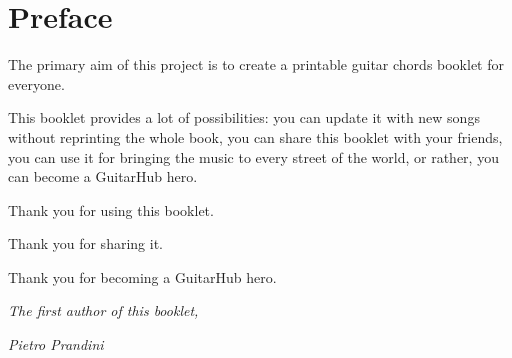 \section*{Preface}
The primary aim of this project is to create a printable guitar chords booklet for everyone.\par
\medskip
This booklet provides a lot of possibilities: you can update it with new songs without reprinting the whole book,
you can share this booklet with your friends, you can use it for bringing the music to every street of the world, or rather, you can become a GuitarHub hero.\par
\medskip
Thank you for using this booklet.\par
\smallskip
Thank you for sharing it.\par
\smallskip
Thank you for becoming a GuitarHub hero.\par
\bigskip
\begin{flushright}
	{\small{\textit{The first author of this booklet,}}}\par
	\medskip
	{\large{\textit{\rmfamily Pietro Prandini}}}\par
\end{flushright}
\newpage
